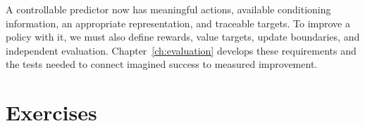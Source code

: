 A controllable predictor now has meaningful actions, available conditioning information, an appropriate representation, and traceable targets. To improve a policy with it, we must also define rewards, value targets, update boundaries, and independent evaluation. Chapter~\ref{ch:evaluation} develops these requirements and the tests needed to connect imagined success to measured improvement.
\FloatBarrier

\section{Exercises}
\FloatBarrier
